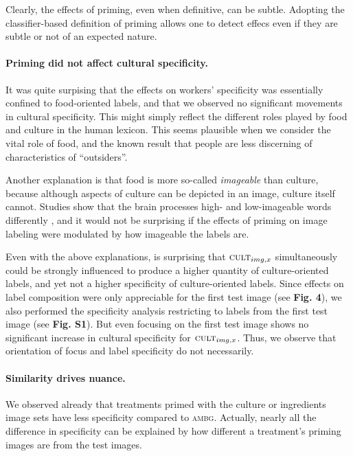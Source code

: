 \documentclass[a4paper]{report}
\begin{document}
Clearly, the effects of
priming, even when definitive, can be subtle. Adopting the classifier-based
definition of priming allows one to detect effecs even if they are subtle or
not of an expected nature.


\paragraph{Priming did not affect cultural specificity.}
It was quite surpising that the effects on workers' specificity was essentially
confined to food-oriented labels, and that we observed no significant movements
in cultural specificity.   This might simply reflect the different roles
played by food and culture in the human lexicon.  This seems plausible when we 
consider the vital role of food, and the known result that people are less
discerning of characteristics of ``outsiders''.

Another explanation is that food is more so-called \textit{imageable} than 
culture, because although aspects of culture can be depicted in an image,
culture itself cannot.  Studies show that the brain processes high- and 
low-imageable words differently \cite{Swaab200299}, and it would not be 
surprising if the effects of priming on image labeling were modulated by how 
imageable the labels are.

Even with the above explanations, is surprising that 
$\textsc{cult}_{img,x}$ simultaneously could be strongly influenced to 
produce a higher quantity of culture-oriented labels, and yet not a higher
specificity of culture-oriented labels.  Since effects on 
label composition were only appreciable for the first test image 
(see \textbf{Fig. 4}), we also
performed the specificity analysis restricting to labels from the first
test image (see \textbf{Fig. S1}).  But even focusing on the first test image
shows no significant increase in cultural specificity for 
$\textsc{cult}_{img,x}$.  Thus, we observe that orientation of focus and 
label specificity do not necessarily.


\paragraph{Similarity drives nuance.}
We observed already that treatments primed with the 
culture or ingredients image sets have less specificity compared to 
\textsc{ambg}.  Actually, nearly all the difference in specificity
can be explained by how different a treatment's priming images are from the 
test images.  
\end{document}
